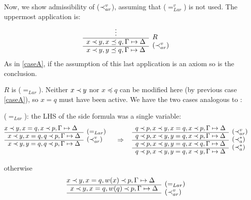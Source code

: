 \begin{PROOF}
\begin{LS}
\item
Now, we show admissibility of ($\mathbin{\prec}_{ar}^v$), assuming that ($=_{Lar}^v$) is not used.
The uppermost application is:
\[ \begin{array}{cl}
\vdots          & \raisebox{-1.2ex}[1.5ex][0ex]{$R$} \\ \cline{1-1}
x\Incl y, x\preceq q, \GSD &
\raisebox{-1.2ex}[1.5ex][0ex]{($\Incl_{ar}^v$)} \\ \cline{1-1}
x\Incl y, y\preceq q, \GSD
\end{array}
\]
As in \ref{caseA}, if the assumption of this last application is an axiom
so is the conclusion. 
\begin{LSA}
\item $R$ is ($=_{Lar}$). Neither $x\mathbin{\prec} y$ nor $x\preceq q$ can be modified here (by 
previous case \ref{caseA}), so $x=q$ must have been active. We have the two cases
analogous to :
\begin{LSB}
\item ($=_{Lar}$): the LHS of the side formula was a single variable:
\[ \begin{array}{cl} \hspace*{-1em}
x\Incl y, x=q, x\Incl p,\GSD    & \raisebox{-1.2ex}[1.5ex][0ex]{($=_{Lar}$)} \\ \cline{1-1}
x\Incl y, x=q, q\Incl p, \GSD &
\raisebox{-1.2ex}[1.5ex][0ex]{($\Incl_{ar}^v$)} \\ \cline{1-1}
x\Incl y, y=q, q\Incl p,\GSD \\ \ 
\end{array}
\conv
\begin{array}{cl}
q\Incl p, x\Incl y, x=q, x\Incl p,\GSD    & \raisebox{-1.2ex}[1.5ex][0ex]{($\Incl_{ar}^v$)} \\ \cline{1-1}
q\Incl p, x\Incl y, y=q, x\Incl p, \GSD &
\raisebox{-1.2ex}[1.5ex][0ex]{($\Incl_a^*$)} \\ \cline{1-1}
q\Incl p, x\Incl y, y=q, x\Incl q, \GSD &
\raisebox{-1.2ex}[1.5ex][0ex]{($\Incl_a^*$)} \\ \cline{1-1}
q\Incl p, x\Incl y, y=q, x\Incl y, \GSD &
\end{array}
\]
\item otherwise
\[ \begin{array}{cl} \hspace*{-1em}
x\Incl y, x=q, w(x)\Incl p,\GSD  & \raisebox{-1.2ex}[1.5ex][0ex]{($=_{Lar}$)} \\ \cline{1-1}
x\Incl y, x=q, w(q)\Incl p, \GSD &
\raisebox{-1.2ex}[1.5ex][0ex]{($\Incl_{ar}^v$)} \\ \cline{1-1}

\end{array}\]
\end{LSB}
\end{LSA}
\end{LS}
\end{PROOF}
